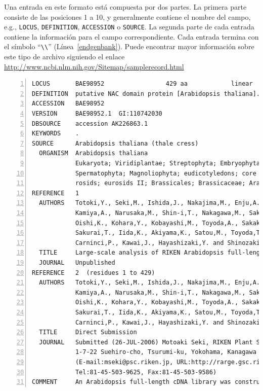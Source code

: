 \documentclass[letter,11pt]{book}
\begin{document}
Una entrada en este formato está compuesta por dos partes. La primera parte consiste de las posiciones 1 a 10, y generalmente contiene el nombre del campo, e.g., \Verb+LOCUS+, \Verb+DEFINITION+, \Verb+ACCESSION+ o \Verb+SOURCE+. La segunda parte de cada entrada contiene la información para el campo correspondiente. Cada entrada termina con el símbolo ``\Verb+\\+'' (Línea~\ref{endgenbank}). Puede encontrar mayor información sobre este tipo de archivo siguiendo el enlace \url{http://www.ncbi.nlm.nih.gov/Sitemap/samplerecord.html}


\begin{Verbatim}[commandchars=!\{\},numbers=left,firstnumber=last,label=Secuencia en formato GenBank,frame=topline,fontsize=\tiny]
LOCUS       BAE98952                 429 aa            linear   PLN 27-JUL-2006
DEFINITION  putative NAC domain protein [Arabidopsis thaliana].
ACCESSION   BAE98952
VERSION     BAE98952.1  GI:110742030
DBSOURCE    accession AK226863.1
KEYWORDS    .
SOURCE      Arabidopsis thaliana (thale cress)
  ORGANISM  Arabidopsis thaliana
            Eukaryota; Viridiplantae; Streptophyta; Embryophyta; Tracheophyta;
            Spermatophyta; Magnoliophyta; eudicotyledons; core eudicotyledons;
            rosids; eurosids II; Brassicales; Brassicaceae; Arabidopsis.
REFERENCE   1
  AUTHORS   Totoki,Y., Seki,M., Ishida,J., Nakajima,M., Enju,A., Morosawa,T.,
            Kamiya,A., Narusaka,M., Shin-i,T., Nakagawa,M., Sakamoto,N.,
            Oishi,K., Kohara,Y., Kobayashi,M., Toyoda,A., Sakaki,Y.,
            Sakurai,T., Iida,K., Akiyama,K., Satou,M., Toyoda,T., Konagaya,A.,
            Carninci,P., Kawai,J., Hayashizaki,Y. and Shinozaki,K.
  TITLE     Large-scale analysis of RIKEN Arabidopsis full-length (RAFL) cDNAs
  JOURNAL   Unpublished
REFERENCE   2  (residues 1 to 429)
  AUTHORS   Totoki,Y., Seki,M., Ishida,J., Nakajima,M., Enju,A., Morosawa,T.,
            Kamiya,A., Narusaka,M., Shin-i,T., Nakagawa,M., Sakamoto,N.,
            Oishi,K., Kohara,Y., Kobayashi,M., Toyoda,A., Sakaki,Y.,
            Sakurai,T., Iida,K., Akiyama,K., Satou,M., Toyoda,T., Konagaya,A.,
            Carninci,P., Kawai,J., Hayashizaki,Y. and Shinozaki,K.
  TITLE     Direct Submission
  JOURNAL   Submitted (26-JUL-2006) Motoaki Seki, RIKEN Plant Science Center;
            1-7-22 Suehiro-cho, Tsurumi-ku, Yokohama, Kanagawa 230-0045, Japan
            (E-mail:mseki@psc.riken.jp, URL:http://rarge.gsc.riken.jp/,
            Tel:81-45-503-9625, Fax:81-45-503-9586)
COMMENT     An Arabidopsis full-length cDNA library was constructed essentially

\end{Verbatim}
\end{document}

